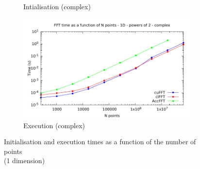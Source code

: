 \documentclass[12pt, a4paper]{article}
\begin{document}
\begin{figure}[H]
\begin{subfigure}{.5\textwidth}
\caption{Intialisation (complex)}
\label{FFTPOW21DCI}
\end{subfigure}%
\begin{subfigure}{.5\textwidth}
\centering
\includegraphics[width=.9\linewidth]{graphs/fft-1d-pow2-c-exec.pdf}
\caption{Execution (complex)}
\label{FFTPOW21DCE}
\end{subfigure}
\caption{Initialisation and execution times as a function of the number of points\\(1 dimension)}
\label{FFTPOW21D}
\end{figure}
\end{document}
